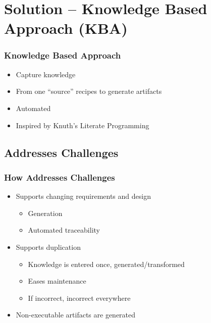 \documentclass{beamer}
\begin{document}

\section[Solution]{Solution -- Knowledge Based Approach (KBA)}


\begin{frame}

\frametitle{Knowledge Based Approach}

\begin{itemize}
\item Capture knowledge
\item From one ``source'' recipes to generate artifacts
\item Automated
\item Inspired by Knuth's Literate Programming
\end{itemize}
\end{frame}


\subsection[Addresses Challenges]{Addresses Challenges}


\begin{frame}

\frametitle{How Addresses Challenges}

\begin{itemize}
\item Supports changing requirements and design
\begin{itemize}
\item Generation
\item Automated traceability
\end{itemize}
\item Supports duplication 
\begin{itemize}
\item Knowledge is entered once, generated/transformed%
\item Eases maintenance
\item If incorrect, incorrect everywhere
\end{itemize}
\item Non-executable artifacts are generated
\end{itemize}
\end{frame}
\end{document}
